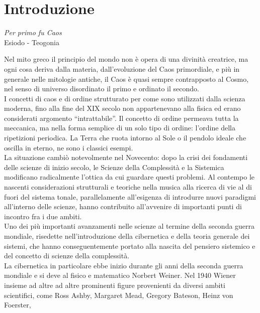\section{Introduzione}
\label{sec:Introduzione}

\begin{center}
\vspace{0.5cm}
\textit{Per primo fu Caos}
\\
Esiodo - Teogonia
\vspace{0.5cm}
\end{center}

Nel mito greco il principio del mondo non è opera di una divinità creatrice,
ma ogni cosa deriva dalla materia, dall’evoluzione del Caos primordiale,
e più in generale nelle mitologie antiche, il Caos è quasi sempre
contrapposto al Cosmo, nel senso di universo disordinato il primo e ordinato
il secondo. \\
I concetti di caos e di ordine strutturato per come sono utilizzati dalla scienza moderna, fino alla fine del XIX secolo non appartenevano alla fisica ed erano considerati argomento “intrattabile”.
Il concetto di ordine permeava tutta la meccanica,
ma nella forma semplice di un solo tipo di ordine: l’ordine della ripetizioni periodica.
La Terra che ruota intorno al Sole o il pendolo ideale che oscilla in eterno, ne sono i classici esempi. \\
La situazione cambiò notevolmente nel Novecento:
dopo la crisi dei fondamenti delle scienze di inizio secolo,
le Scienze della Complessità e la Sistemica modificano radicalmente l’ottica da cui guardare questi problemi. \cite{caosvillani}
Al contempo le nascenti considerazioni strutturali e teoriche
nella musica alla ricerca di vie al di fuori del sistema tonale,
parallelamente all'esigenza di introdurre nuovi paradigmi all'interno delle scienze,
hanno contribuito all'avvenire di importanti punti di incontro fra i due ambiti.
\\
Uno dei più importanti avanzamenti nelle scienze
al termine della seconda guerra mondiale, risedette nell'introduzione della
cibernetica e della teoria generale dei sistemi, che hanno conseguentemente
portato alla nascita del pensiero sistemico e del concetto
di scienze della complessità.
\\
La cibernetica in particolare ebbe inizio durante gli anni della seconda guerra
mondiale e si deve al fisico e matematico Norbert Weiner.
Nel 1940 Wiener insieme ad altre ad altre prominenti figure provenienti
da diversi ambiti scientifici,
come Ross Ashby, Margaret Mead, Gregory Bateson, Heinz von Foerster,
